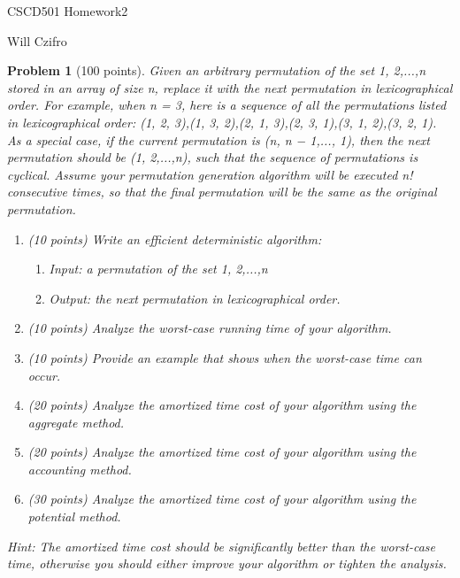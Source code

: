 \documentclass[11pt]{article}
\newtheorem{problem}{Problem}
\begin{document}
\begin{center}
  {\LARGE CSCD501 Homework2}

\bigskip 

{\Large Will Czifro}

\end{center}

\bigskip 

\begin{problem}[100 points]
\label{prob:1}
Given an arbitrary permutation of the set {1, 2,...,n} stored in an array of size n, replace
it with the next permutation in lexicographical order. For example, when n = 3, here is a sequence of all the permutations
listed in lexicographical order: (1, 2, 3),(1, 3, 2),(2, 1, 3),(2, 3, 1),(3, 1, 2),(3, 2, 1). As a special case, if
the current permutation is (n, n − 1,..., 1), then the next permutation should be (1, 2,...,n), such that the sequence
of permutations is cyclical. Assume your permutation generation algorithm will be executed n! consecutive times, so
that the final permutation will be the same as the original permutation.

\begin{enumerate}
  \item (10 points) Write an efficient deterministic algorithm:

    \begin{enumerate}
      \item Input: a permutation of the set {1, 2,...,n}
      \item Output: the next permutation in lexicographical order.
    \end{enumerate}

  \item (10 points) Analyze the worst-case running time of your algorithm.
  \item (10 points) Provide an example that shows when the worst-case time can occur.
  \item (20 points) Analyze the amortized time cost of your algorithm using the aggregate method.
  \item (20 points) Analyze the amortized time cost of your algorithm using the accounting method.
  \item (30 points) Analyze the amortized time cost of your algorithm using the potential method.
\end{enumerate}

Hint: The amortized time cost should be significantly better than the worst-case time, otherwise you should either
improve your algorithm or tighten the analysis.
\end{problem}
\end{document}
